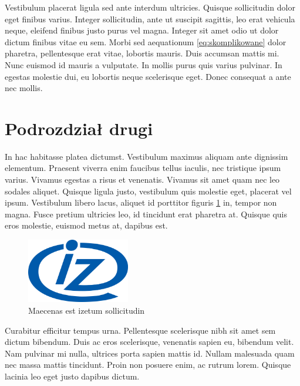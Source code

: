 \documentclass[polish,engineering]{wizthesis}
\begin{document}
Vestibulum placerat ligula sed ante interdum ultricies. Quisque sollicitudin
dolor eget finibus varius. Integer sollicitudin, ante ut suscipit sagittis, leo
erat vehicula neque, eleifend finibus justo purus vel magna. Integer sit amet
odio ut dolor dictum finibus vitae eu sem. Morbi sed aequationum
\eqref{eq:skomplikowane} dolor pharetra, pellentesque erat vitae, lobortis
mauris. Duis accumsan mattis mi. Nunc euismod id mauris a vulputate. In mollis
purus quis varius pulvinar. In egestas molestie dui, eu lobortis neque
scelerisque eget. Donec consequat a ante nec mollis.

\section{Podrozdział drugi}

In hac habitasse platea dictumst. Vestibulum maximus aliquam ante dignissim
elementum. Praesent viverra enim faucibus tellus iaculis, nec tristique ipsum
varius. Vivamus egestas a risus et venenatis. Vivamus sit amet quam nec leo
sodales aliquet. Quisque ligula justo, vestibulum quis molestie eget, placerat
vel ipsum. Vestibulum libero lacus, aliquet id porttitor figuris \ref{fig:iz}
in, tempor non magna. Fusce pretium ultricies leo, id tincidunt erat pharetra
at. Quisque quis eros molestie, euismod metus at, dapibus est.
\begin{figure}[ht]
  \centering
  \includegraphics[width=0.4\textwidth]{img/iz_logo.png}
  \caption{Maecenas est izetum sollicitudin}
  \label{fig:iz}
\end{figure}

Curabitur efficitur tempus urna. Pellentesque scelerisque nibh sit amet sem
dictum bibendum. Duis ac eros scelerisque, venenatis sapien eu, bibendum velit.
Nam pulvinar mi nulla, ultrices porta sapien mattis id. Nullam malesuada quam
nec massa mattis tincidunt. Proin non posuere enim, ac rutrum lorem. Quisque
lacinia leo eget justo dapibus dictum.
\end{document}
